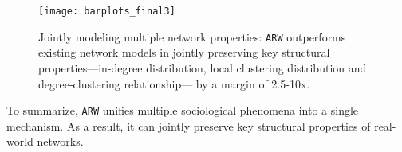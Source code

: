 \begin{figure}
	\centering
	\vspace{-16pt}
	\texttt{[image: barplots\_final3]}
	\caption{Jointly modeling multiple network properties: \texttt{ARW} outperforms
		existing network models in jointly preserving key structural properties---in-degree
		distribution, local clustering distribution and degree-clustering relationship---
		by a margin of 2.5-10x.
	}
	\vspace{-8pt}
	\label{fig:barplot}
\end{figure}

To summarize, \texttt{ARW} unifies multiple sociological phenomena
into a single mechanism. As a result, it can jointly preserve key structural
properties of real-world networks.







